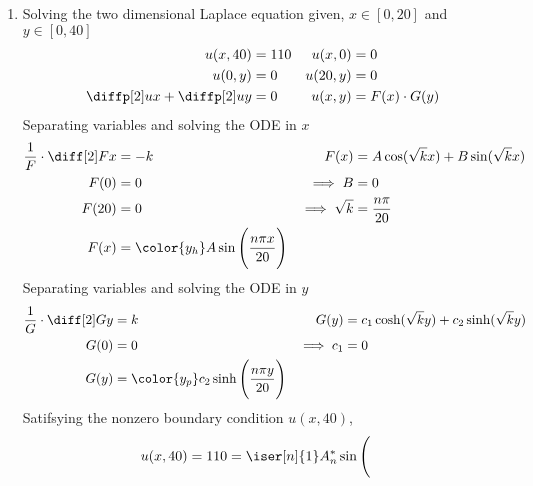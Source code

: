 \begin{enumerate}
    \item Solving the two dimensional Laplace equation given, $ x \in [0, 20] $ and
          $ y \in [0, 40] $
          \begin{align}
              u(x, 40)                   & = 110             &
              u(x, 0)                    & = 0                 \\
              u(0, y)                    & = 0               &
              u(20, y)                   & = 0                 \\
              \diffp[2] ux +\diffp[2] uy & = 0               &
              u(x, y)                    & = F(x) \cdot G(y)
          \end{align}
          Separating variables and solving the ODE in $ x $
          \begin{align}
              \frac{1}{F} \cdot \diff[2] Fx & = -k                                  &
              F(x)                          & = A\cos(\sqrt{k}x) + B\sin(\sqrt{k}x)   \\
              F(0)                          & = 0                                   &
              \implies B                    & = 0                                     \\
              F(20)                         & = 0                                   &
              \implies \sqrt{k}             & = \frac{n\pi}{20}                       \\
              F(x)                          & = \color{y_h} A\sin\Bigg(
              \frac{n\pi x}{20} \Bigg)
          \end{align}
          Separating variables and solving the ODE in $ y $
          \begin{align}
              \frac{1}{G} \cdot \diff[2] Gy & = k                           &
              G(y)                          & = c_1 \cosh(\sqrt{k}y)
              + c_2\sinh(\sqrt{k}y)                                           \\
              G(0)                          & = 0                           &
              \implies c_1                  & = 0                             \\
              G(y)                          & = \color{y_p} c_2 \sinh\Bigg(
              \frac{n\pi y}{20}\Bigg)
          \end{align}
          Satifsying the nonzero boundary condition $ u(x, 40) $,
          \begin{align}
              u(x, 40)           & = 110 = \iser[n]{1} A_n^* \sin\Bigg(

\end{align}
\end{enumerate}

